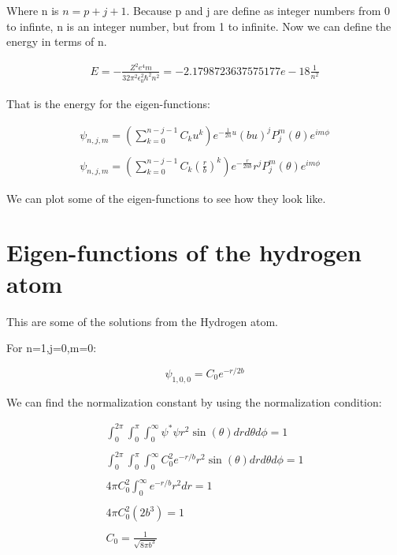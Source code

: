 Where n is $n=p+j+1$. Because p and j are define as integer numbers from 0 to infinte, n is an integer number, but from 1 to infinite. Now we can define the energy in terms of n.

\begin{equation}
  \begin{array}{c}
    E = -\frac{Z^2 e^4 m}{32\pi^2\epsilon_0^2\hbar^2 n^2} = -2.1798723637575177e-18 \frac{1}{n^2}
  \end{array}
\end{equation}

That is the energy for the eigen-functions:

\begin{equation}
  \begin{array}{c}
    \psi_{n,j,m} = \left(\sum_{k=0}^{n-j-1} C_k u^k \right)e^{-\frac{1}{2n}u}(bu)^j P_j^m(\theta)e^{im\phi}
    \\

    \\
    \psi_{n,j,m} = \left(\sum_{k=0}^{n-j-1} C_k \left(\frac{r}{b}\right)^k \right)e^{-\frac{r}{2nb}}r^j P_j^m(\theta)e^{im\phi}
  \end{array}
\end{equation}

We can plot some of the eigen-functions to see how they look like.

\section{Eigen-functions of the hydrogen atom}

This are some of the solutions from the Hydrogen atom.

For n=1,j=0,m=0:

\begin{equation}
  \psi_{1,0,0} = C_0 e^{-r/2b}
\end{equation}

We can find the normalization constant by using the normalization condition:

\begin{equation}
\begin{array}{c}
  \int_{0}^{2\pi}\int_{0}^{\pi}\int_{0}^{\infty} \psi^*\psi r^2 \sin(\theta) dr d\theta d\phi = 1
  \\

  \\
  \int_{0}^{2\pi}\int_{0}^{\pi}\int_{0}^{\infty} C_0^2 e^{-r/b} r^2 \sin(\theta) dr d\theta d\phi = 1
  \\

  \\
  4 \pi C_0^2 \int_{0}^{\infty} e^{-r/b} r^2 dr = 1
  \\

  \\
  4 \pi C_0^2 (2b^3) = 1
  \\

  \\
  C_0 = \frac{1}{\sqrt{8\pi b^3}}
\end{array}
\end{equation}

